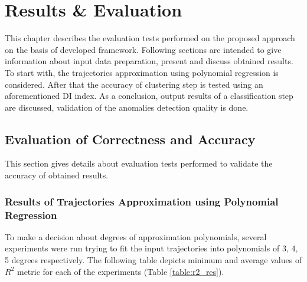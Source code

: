 \chapter{Results \& Evaluation}
\label{ch:Results and Evaluation}

This chapter describes the evaluation tests performed on the proposed approach on the basis of developed framework. Following sections are intended to give information about input data preparation, present and discuss obtained results. To start with, the trajectories approximation using polynomial regression is considered. After that the accuracy of clustering step is tested using an aforementioned DI index. As a conclusion, output results of a classification step are discussed, validation of the anomalies detection quality is done.

\section{Evaluation of Correctness and Accuracy}

This section gives details about evaluation tests performed to validate the accuracy of obtained results.

\subsection{Results of Trajectories Approximation using Polynomial Regression}

To make a decision about degrees of approximation polynomials, several experiments were run trying to fit the input trajectories into polynomials of 3, 4, 5 degrees respectively. The following table depicts minimum and average values of $R^2$ metric for each of the experiments (Table \ref{table:r2_res}). 

